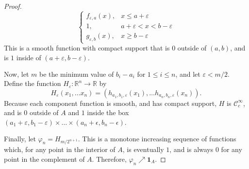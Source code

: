 \documentclass[12pt]{article}
\newcommand{\R}{\mathbb{R}}
\theoremstyle{definition}
\newenvironment{problem}[2][Problem]{\begin{trivlist}
\item[\hskip \labelsep {\bfseries #1}\hskip \labelsep {\bfseries #2.}]}{\end{trivlist}}
\begin{document}
\begin{problem}{1}
\begin{proof}
\[\begin{cases}
			f_{\varepsilon,a}(x), & x \leq a + \varepsilon\\
			1, & a + \varepsilon < x < b - \varepsilon\\
			g_{\varepsilon, b}(x), & x \geq b - \varepsilon
\end{cases}\]
This is a smooth function with compact support that is $0$ outside of $(a,b)$, and is $1$ inside of $(a + \varepsilon, b - \varepsilon)$.
\par Now, let $m$ be the minimum value of $b_i - a_i$ for $1 \leq i \leq n$, and let $\varepsilon < m/2$. Define the function $H_\varepsilon: \R^n \to \R$ by 
\[H_\varepsilon(x_1, \dots x_n) = (h_{a_1, b_1, \varepsilon}(x_1), \dots h_{a_n, b_n, \varepsilon}(x_n)).\]
Because each component function is smooth, and has compact support, $H$ is $\mathcal{C}^\infty_c$, and is $0$ outside of $A$ and $1$ inside the box $(a_1 + \varepsilon, b_1 - \varepsilon) \times \dots \times (a_n + \epsilon, b_n - \epsilon)$. 
\par Finally, let $\varphi_n = H_{m/2^{n+1}}$. This is a monotone increasing sequence of functions which, for any point in the interior of $A$, is eventually $1$, and is always $0$ for any point in the complement of $A$. Therefore, $\varphi_n \nearrow \mathbf 1_A$.
	\end{proof}
\end{problem}
\end{document}
